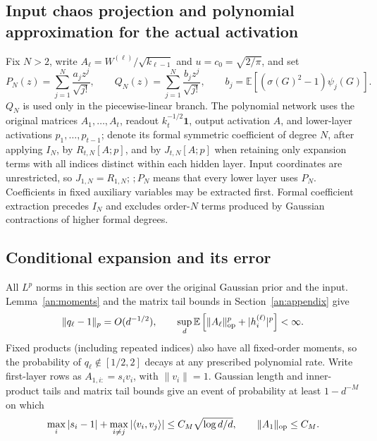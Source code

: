 \documentclass[a4paper]{tufte-handout}
\newcommand{\E}{\mathbb E}
\begin{document}
\begin{fullwidth}
\section{Input chaos projection and polynomial approximation for the actual activation}
\label{fp:actual-section}\label{app:closure}
Fix $N>2$, write $A_\ell=W^{(\ell)}/\sqrt{k_{\ell-1}}$ and $u=c_0=\sqrt{2/\pi}$, and set
\begin{equation}\label{fp:actual-PQ}
 P_N(z)=\sum_{j=1}^N\frac{a_jz^j}{\sqrt{j!}},\qquad
 Q_N(z)=\sum_{j=1}^N\frac{b_jz^j}{\sqrt{j!}},\qquad
 b_j=\E[(\sigma(G)^2-1)\psi_j(G)].
\end{equation}
$Q_N$ is used only in the piecewise-linear branch. The polynomial network uses the original matrices $A_1,\ldots,A_t$, readout
$k_t^{-1/2}\mathbf1$, output activation $A$, and lower-layer activations $p_1,\ldots,p_{t-1}$;
denote its formal symmetric coefficient of degree $N$, after applying $I_N$, by $R_{t,N}[A;p]$,
and by $J_{t,N}[A;p]$ when retaining only expansion terms with all indices distinct within each hidden layer.
Input coordinates are unrestricted, so $J_{1,N}=R_{1,N}$; $;P_N$ means that every lower layer uses $P_N$.
Coefficients in fixed auxiliary variables may be extracted first. Formal coefficient extraction precedes $I_N$
and excludes order-$N$ terms produced by Gaussian contractions of higher formal degrees.

\subsection{Conditional expansion and its error}
\label{fp:actual-finite-support}\label{fp:actual-positive}
All $L^p$ norms in this section are over the original Gaussian prior and the input. Lemma~\ref{an:moments} and
the matrix tail bounds in Section~\ref{an:appendix} give
\begin{equation}\label{fp:actual-local-interface}
 \|q_\ell-1\|_p=O(d^{-1/2}),\qquad
 \sup_d\E\left[\|A_\ell\|_{\rm op}^p+|h_i^{(\ell)}|^p\right]<\infty.
\end{equation}
Fixed products (including repeated indices) also have all fixed-order moments, so the probability of $q_\ell\notin[1/2,2]$
decays at any prescribed polynomial rate. Write first-layer rows as $A_{1,i:}=s_iv_i$, with $\|v_i\|=1$.
Gaussian length and inner-product tails and matrix tail bounds give an event of probability at least $1-d^{-M}$ on which
\begin{equation}\label{fp:actual-row-event}
 \max_i|s_i-1|+\max_{i\ne j}|\langle v_i,v_j\rangle|
 \le C_M\sqrt{\log d/d},\qquad \|A_1\|_{\rm op}\le C_M.
\end{equation}


\end{fullwidth}
\end{document}
